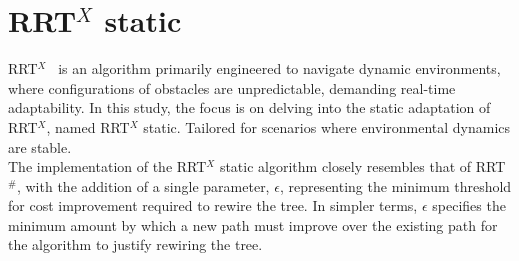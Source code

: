 \documentclass{ctuthesis}
\begin{document}
\section{\texorpdfstring{RRT$^X$ static}{Title without Superscript}}
RRT$^X$~\cite{Otte2015RRTX} is an algorithm primarily engineered to navigate dynamic environments, 
where configurations of obstacles are unpredictable, demanding real-time adaptability.
In this study, 
the focus is on delving into the static adaptation of RRT$^X$, named RRT$^X$ static. 
Tailored for scenarios where environmental dynamics are stable.
\\[12pt]
The implementation of the RRT$^X$ static algorithm closely resembles that of RRT$^\#$, 
with the addition of a single parameter, 
$\epsilon$, representing the minimum threshold for cost improvement required to rewire the tree. 
In simpler terms, 
$\epsilon$ specifies the minimum amount by which a new path must improve over the existing path 
for the algorithm to justify rewiring the tree.
\end{document}
